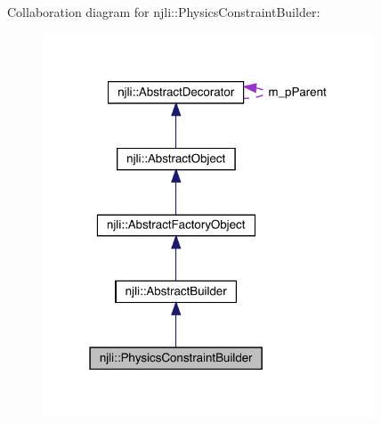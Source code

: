 Collaboration diagram for njli\+:\+:Physics\+Constraint\+Builder\+:\nopagebreak
\begin{figure}[H]
\begin{center}
\leavevmode
\includegraphics[width=279pt]{classnjli_1_1_physics_constraint_builder__coll__graph}
\end{center}
\end{figure}
